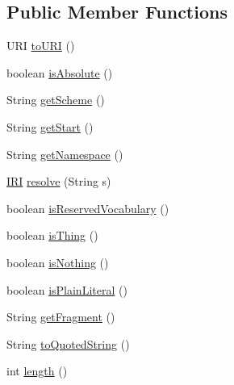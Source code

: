\subsection*{Public Member Functions}
\begin{DoxyCompactItemize}
\item 
U\-R\-I \hyperlink{classorg_1_1semanticweb_1_1owlapi_1_1model_1_1_i_r_i_a6edb4320d80deb1e0c3ef4dc2c53548b}{to\-U\-R\-I} ()
\item 
boolean \hyperlink{classorg_1_1semanticweb_1_1owlapi_1_1model_1_1_i_r_i_abd83594f4be6ece4037d28088ffe1b11}{is\-Absolute} ()
\item 
String \hyperlink{classorg_1_1semanticweb_1_1owlapi_1_1model_1_1_i_r_i_a3d8d67a0cfb3373a284c9444a31455f5}{get\-Scheme} ()
\item 
String \hyperlink{classorg_1_1semanticweb_1_1owlapi_1_1model_1_1_i_r_i_a163c15f9487f650dc1c4a4940f55a4ca}{get\-Start} ()
\item 
String \hyperlink{classorg_1_1semanticweb_1_1owlapi_1_1model_1_1_i_r_i_a83b9e3786698e668dddd72a2d8237673}{get\-Namespace} ()
\item 
\hyperlink{classorg_1_1semanticweb_1_1owlapi_1_1model_1_1_i_r_i}{I\-R\-I} \hyperlink{classorg_1_1semanticweb_1_1owlapi_1_1model_1_1_i_r_i_ac0dc907f0ed7a40e2c9946e054b2e9c5}{resolve} (String s)
\item 
boolean \hyperlink{classorg_1_1semanticweb_1_1owlapi_1_1model_1_1_i_r_i_a311489ca7be5ecc7b09e275b047d1e69}{is\-Reserved\-Vocabulary} ()
\item 
boolean \hyperlink{classorg_1_1semanticweb_1_1owlapi_1_1model_1_1_i_r_i_af7c8929fe51b1912ff6f65072a71b8ec}{is\-Thing} ()
\item 
boolean \hyperlink{classorg_1_1semanticweb_1_1owlapi_1_1model_1_1_i_r_i_a6f301810c0f618423e957647288c4a82}{is\-Nothing} ()
\item 
boolean \hyperlink{classorg_1_1semanticweb_1_1owlapi_1_1model_1_1_i_r_i_a4dd0a7d215c43762acafe0edfc2a24b5}{is\-Plain\-Literal} ()
\item 
String \hyperlink{classorg_1_1semanticweb_1_1owlapi_1_1model_1_1_i_r_i_a2199426933d73137ff483dc3ab5e45e8}{get\-Fragment} ()
\item 
String \hyperlink{classorg_1_1semanticweb_1_1owlapi_1_1model_1_1_i_r_i_a10f52e371259c2877162003eec525497}{to\-Quoted\-String} ()
\item 
int \hyperlink{classorg_1_1semanticweb_1_1owlapi_1_1model_1_1_i_r_i_a279b1128d22bf16abb409462b1208878}{length} ()
\item 

\end{DoxyCompactItemize}
